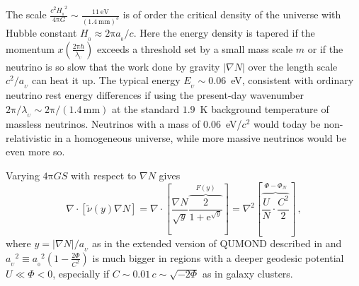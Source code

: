 \documentclass[fleqn,usenatbib,useAMS]{mnras} %
\begin{document}
The scale $\frac{c^2 {H_{_0}}^2}{4 \mathrm{\pi} G} \sim  \frac{11~\mathrm{eV}}{(1.4~\mathrm{mm})^3}$ is of order the critical density of the universe with Hubble constant $H_{_0} \approx 2 \mathrm{\pi} a_{_0}/c$. Here the energy density is tapered if the momentum $x \left( \frac{2\mathrm{\pi}\hbar}{\lambda_{_U}} \right)$ exceeds a threshold set by a small mass scale $m$ or if the neutrino is so slow that the work done by gravity $\left| \nabla N \right|$ over the length scale $c^2/a_{_U}$ can heat it up. The typical energy $E_{_U} \sim 0.06$~eV, consistent with ordinary neutrino rest energy differences if using the present-day wavenumber $2\mathrm{\pi}/\lambda_{_U} \sim 2\mathrm{\pi}/\left( 1.4 \, \text{mm} \right)$ at the standard $1.9$~K background temperature of massless neutrinos. Neutrinos with a mass of 0.06~eV/$c^2$ would today be non-relativistic in a homogeneous universe, while more massive neutrinos would be even more so.


Varying $4 \mathrm{\pi} G S$ with respect to $\nabla N$ gives
\begin{equation}
    \nabla \cdot 
    \left[ {\widetilde{\nu}(y)\nabla N }\right] = \nabla \cdot \left[\frac{\nabla N}{\sqrt{y}} \overbrace{ \frac{2}{1 + \mathrm{e}^{\sqrt{y}}} }^{F(y)} \right] = \nabla^2 \left[\overbrace{\frac{U}{N} \cdot \frac{C^2}{2}}^{\Phi-\Phi_N} \right] \, ,
    \label{FDMOND}
\end{equation}
where $y = \left| \nabla N \right|/a_{_U}$ as in the extended version of QUMOND described in \citet{Zhao_2012} and ${a_{_U}}^2 \equiv {a_{_0}}^2 \left( 1 - \frac{2\Phi}{C^2} \right)$ is much bigger in regions with a deeper geodesic potential $U \ll \Phi < 0$, especially if $C \sim 0.01 \, c \sim \sqrt{-2\Phi}$ as in galaxy clusters.
\end{document}

